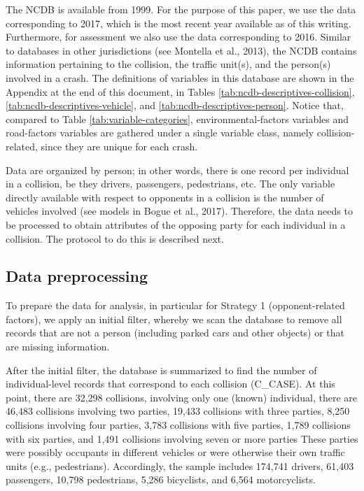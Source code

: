 \documentclass[]{elsarticle} %
\begin{document}
The NCDB is available from 1999. For the purpose of this paper, we use
the data corresponding to 2017, which is the most recent year available
as of this writing. Furthermore, for assessment we also use the data
corresponding to 2016. Similar to databases in other jurisdictions (see
Montella et al., 2013), the NCDB contains information pertaining to the
collision, the traffic unit(s), and the person(s) involved in a crash.
The definitions of variables in this database are shown in the Appendix
at the end of this document, in Tables
\ref{tab:ncdb-descriptives-collision},
\ref{tab:ncdb-descriptives-vehicle}, and
\ref{tab:ncdb-descriptives-person}. Notice that, compared to Table
\ref{tab:variable-categories}, environmental-factors variables and
road-factors variables are gathered under a single variable class,
namely collision-related, since they are unique for each crash.

Data are organized by person; in other words, there is one record per
individual in a collision, be they drivers, passengers, pedestrians,
etc. The only variable directly available with respect to opponents in a
collision is the number of vehicles involved (see models in Bogue et
al., 2017). Therefore, the data needs to be processed to obtain
attributes of the opposing party for each individual in a collision. The
protocol to do this is described next.

\hypertarget{data-preprocessing}{%
\subsection{Data preprocessing}\label{data-preprocessing}}

To prepare the data for analysis, in particular for Strategy 1
(opponent-related factors), we apply an initial filter, whereby we scan
the database to remove all records that are not a person (including
parked cars and other objects) or that are missing information.

After the initial filter, the database is summarized to find the number
of individual-level records that correspond to each collision (C\_CASE).
At this point, there are 32,298 collisions, involving only one (known)
individual, there are 46,483 collisions involving two parties, 19,433
collisions with three parties, 8,250 collisions involving four parties,
3,783 collisions with five parties, 1,789 collisions with six parties,
and 1,491 collisions involving seven or more parties These parties were
possibly occupants in different vehicles or were otherwise their own
traffic units (e.g., pedestrians). Accordingly, the sample includes
174,741 drivers, 61,403 passengers, 10,798 pedestrians, 5,286
bicyclists, and 6,564 motorcyclists.
\end{document}
